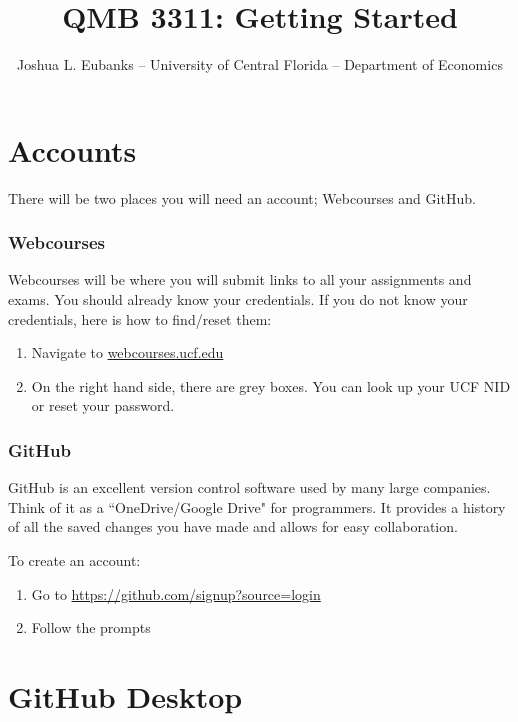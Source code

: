 \documentclass[11pt]{paper}
\begin{document}
\title{QMB 3311: Getting Started}
\author{Joshua L. Eubanks -- University of Central Florida -- Department of Economics}

\maketitle
\hrulefill

\tableofcontents

\section{Accounts}

There will be two places you will need an account; Webcourses and GitHub.

\subsubsection*{Webcourses}

Webcourses will be where you will submit links to all your assignments and exams. You should already know your credentials. If you do not know your credentials, here is how to find/reset them:

\begin{enumerate}
\item Navigate to \href{webcourses.ucf.edu}{webcourses.ucf.edu}
\item On the right hand side, there are grey boxes. You can look up your UCF NID or reset your password.
\end{enumerate}

\subsubsection*{GitHub}

GitHub is an excellent version control software used by many large companies. Think of it as a ``OneDrive/Google Drive" for programmers. It provides a history of all the saved changes you have made and allows for easy collaboration. 

To create an account:
\begin{enumerate}
\item Go to \href{https://github.com/signup?source=login}{https://github.com/signup?source=login}
\item Follow the prompts
\end{enumerate} 

\section{GitHub Desktop}
\end{document}
